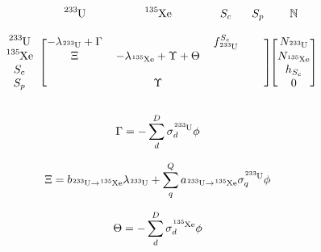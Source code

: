 \documentclass[]{elsarticle}
\begin{document}
    \begin{equation}
    \label{fig:burn_matrix}
        \begin{blockarray}{cccccc}
             &
            \ce{^{233}U} &
            \ce{^{135}Xe} &
            S_{c} &
            S_{p} &
            \mathbb{N} \\
             &
             &
             &
             &
             &
             \\ 
        \begin{block}{c[cccc][c]}
            \ce{^{233}U} &
            -\lambda_{\ce{^{233}U}} + \Gamma &
             &
            f^{S_{c}}_{\ce{^{233}U}} &
             &
            N_{\ce{^{233}U}} \\
            \ce{^{135}Xe} &
            \Xi &
            -\lambda_{\ce{^{135}Xe}} + \Upsilon + \Theta &
             &
             &
            N_{\ce{^{135}Xe}} \\
            S_{c} &
             &
             &
             &
             &
            h_{S_{c}} \\
            S_{p} &
             &
             \Upsilon &
             &
             &
             0\\
        \end{block}
        \end{blockarray}
    \end{equation}

\begin{equation}
\label{eq:Gamma_def}
\Gamma = - \sum \limits_{d}^{D} \sigma_{d}^{\ce{^{233}U}} \phi
\end{equation}

\begin{equation}
\label{eq:Xi_def}
\Xi = b_{\ce{^{233}U} \rightarrow \ce{^{135}Xe}} \lambda_{\ce{^{233}U}} + \sum
\limits_{q}^{Q} a_{\ce{^{233}U} \rightarrow \ce{^{135}Xe}} \sigma_{q}^{
\ce{^{233}U}} \phi
\end{equation}

\begin{equation}
\label{eq:Theta_def}
\Theta = - \sum \limits_{d}^{D} \sigma_{d}^{\ce{^{135}Xe}} \phi
\end{equation}
\end{document}
